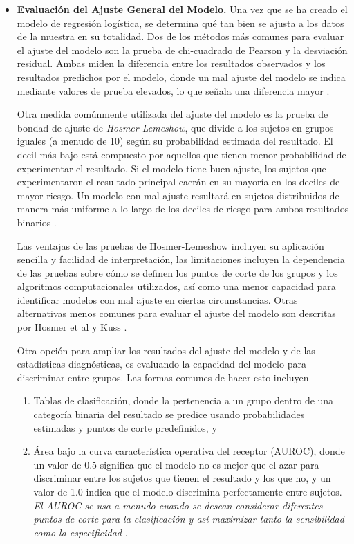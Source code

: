 \documentclass[12pt]{article}
\begin{document}
\begin{itemize}
\item \textbf{Evaluaci\'on del Ajuste General del Modelo.} Una vez que se ha creado el modelo de regresi\'on log\'istica, se determina qu\'e tan bien se ajusta a los datos de la muestra en su totalidad. Dos de los m\'etodos m\'as comunes para evaluar el ajuste del modelo son la prueba de chi-cuadrado de Pearson y la desviaci\'on residual. Ambas miden la diferencia entre los resultados observados y los resultados predichos por el modelo, donde un mal ajuste del modelo se indica mediante valores de prueba elevados, lo que se\~nala una diferencia mayor \cite{hosmer2000, hosmer1997, kuss2002}.

Otra medida com\'unmente utilizada del ajuste del modelo es la prueba de bondad de ajuste de \textit{Hosmer-Lemeshow}, que divide a los sujetos en grupos iguales (a menudo de 10) seg\'un su probabilidad estimada del resultado. El decil m\'as bajo est\'a compuesto por aquellos que tienen menor probabilidad de experimentar el resultado. Si el modelo tiene buen ajuste, los sujetos que experimentaron el resultado principal caer\'an en su mayor\'ia en los deciles de mayor riesgo. Un modelo con mal ajuste resultar\'a en sujetos distribuidos de manera m\'as uniforme a lo largo de los deciles de riesgo para ambos resultados binarios \cite{tabachnick2007, hosmer2000}.

Las ventajas de las pruebas de Hosmer-Lemeshow incluyen su aplicaci\'on sencilla y facilidad de interpretaci\'on, las limitaciones incluyen la dependencia de las pruebas sobre c\'omo se definen los puntos de corte de los grupos y los algoritmos computacionales utilizados, as\'i como una menor capacidad para identificar modelos con mal ajuste en ciertas circunstancias.  Otras alternativas menos comunes para evaluar el ajuste del modelo son descritas por Hosmer et al \cite{hosmer1997} y Kuss \cite{kuss2002}.

Otra opci\'on para ampliar los resultados del ajuste del modelo y de las estad\'isticas diagn\'osticas, es evaluando la capacidad del modelo para discriminar entre grupos. Las formas comunes de hacer esto incluyen 

\begin{enumerate}
\item  Tablas de clasificaci\'on, donde la pertenencia a un grupo dentro de una categor\'ia binaria del resultado se predice usando probabilidades estimadas y puntos de corte predefinidos, y 
\item  \'Area bajo la curva caracter\'istica operativa del receptor (AUROC), donde un valor de 0.5 significa que el modelo no es mejor que el azar para discriminar entre los sujetos que tienen el resultado y los que no, y un valor de 1.0 indica que el modelo discrimina perfectamente entre sujetos. \textit{El AUROC se usa a menudo cuando se desean considerar diferentes puntos de corte para la clasificaci\'on y as\'i maximizar tanto la sensibilidad como la especificidad} \cite{zou2007}.
\end{enumerate}


\end{itemize}
\end{document}
